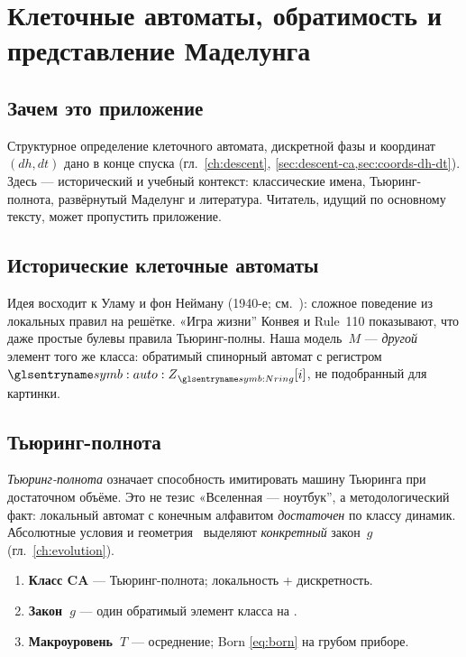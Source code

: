 \chapter{Клеточные автоматы, обратимость и представление Маделунга}
\label{app:background}

\section{Зачем это приложение}

Структурное определение клеточного автомата, дискретной фазы и координат $(dh,dt)$
дано в конце спуска (гл.~\ref{ch:descent}, \cref{sec:descent-ca,sec:coords-dh-dt}).
Здесь --- исторический и учебный контекст: классические имена, Тьюринг-полнота,
развёрнутый Маделунг и литература.
Читатель, идущий по основному тексту, может пропустить приложение.

\section{Исторические клеточные автоматы}

Идея восходит к Уламу и фон Нейману (1940-е; см.\ \cite{vonneumann1966}):
сложное поведение из локальных правил на решётке.
«Игра жизни'' Конвея \cite{gardner1970} и Rule~110 \cite{cook2004}
показывают, что даже простые булевы правила Тьюринг-полны.
Наша модель~$M$ --- \emph{другой} элемент того же класса:
обратимый спинорный автомат с регистром $\spaceZ_{\phaseRingCount}[i]$, не подобранный для картинки.

\section{Тьюринг-полнота}
\label{sec:app-universality}

\emph{Тьюринг-полнота} означает способность имитировать машину Тьюринга при достаточном объёме.
Это не тезис «Вселенная --- ноутбук'', а методологический факт:
локальный автомат с конечным алфавитом \emph{достаточен} по классу динамик.
Абсолютные условия и геометрия \latGCKshort\ выделяют \emph{конкретный} закон~$g$ (гл.~\ref{ch:evolution}).

\begin{remark}
\begin{enumerate}
\item \textbf{Класс CA} --- Тьюринг-полнота; локальность + дискретность.
\item \textbf{Закон~$g$} --- один обратимый элемент класса на \latGCK.
\item \textbf{Макроуровень~$T$} --- осреднение; Born \eqref{eq:born} на грубом приборе.
\end{enumerate}
\end{remark}

